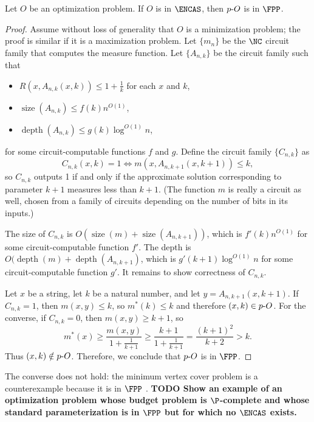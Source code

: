 \documentclass{article}
\newcommand{\todo}[1]{\textbf{TODO #1}}
\newcommand{\dash}{\textnormal{-}}
\DeclareMathOperator{\depth}{depth}
\DeclareMathOperator{\size}{size}
\begin{document}
\begin{theorem}\label{thm:encasfpp}
  Let $O$ be an optimization problem.
  If $O$ is in $\ENCAS$, then $p\dash{O}$ is in $\FPP$.
\end{theorem}
\begin{proof}
  Assume without loss of generality that $O$ is a minimization problem; the proof is similar if it is a maximization problem.
  Let $\{m_n\}$ be the $\NC$ circuit family that computes the measure function.
  Let $\{A_{n, k}\}$ be the circuit family such that
  \begin{itemize}
  \item $R(x, A_{n, k}(x, k)) \leq 1 + \frac{1}{k}$ for each $x$ and $k$,
  \item $\size(A_{n, k}) \leq f(k) n^{O(1)}$,
  \item $\depth(A_{n, k}) \leq g(k) \log^{O(1)} n$,
  \end{itemize}
  for some circuit-computable functions $f$ and $g$.
  Define the circuit family $\{C_{n, k}\}$ as
  \[
  C_{n, k}(x, k) = 1 \iff m(x, A_{n, k + 1}(x, k + 1)) \leq k,
  \]
  so $C_{n, k}$ outputs 1 if and only if the approximate solution corresponding to parameter $k + 1$ measures less than $k + 1$.
  (The function $m$ is really a circuit as well, chosen from a family of circuits depending on the number of bits in its inputs.)

  The size of $C_{n, k}$ is $O(\size(m) + \size(A_{n, k + 1}))$, which is $f'(k)n^{O(1)}$ for some circuit-computable function $f'$.
  The depth is $O(\depth(m) + \depth(A_{n, k + 1})$, which is $g'(k + 1) \log^{O(1)} n$ for some circuit-computable function $g'$.
  It remains to show correctness of $C_{n, k}$.

  Let $x$ be a string, let $k$ be a natural number, and let $y = A_{n, k + 1}(x, k + 1)$.
  If $C_{n, k} = 1$, then $m(x, y) \leq k$, so $m^*(k) \leq k$ and therefore $(x, k) \in p \dash O$.
  For the converse, if $C_{n, k} = 0$, then $m(x, y) \geq k + 1$, so
  \[
  m^*(x) \geq \frac{m(x, y)}{1 + \frac{1}{k + 1}} \geq \frac{k + 1}{1 + \frac{1}{k + 1}} = \frac{(k + 1)^2}{k + 2} > k.
  \]
  Thus $(x, k) \notin p \dash O$.
  Therefore, we conclude that $p \dash O$ is in $\FPP$.
\end{proof}

The converse does not hold: the minimum vertex cover problem is a counterexample because it is in $\FPP$ \autocite[Theorem~4.5]{bst15}.
\todo{Show an example of an optimization problem whose budget problem is $\P$-complete and whose standard parameterization is in $\FPP$ but for which no $\ENCAS$ exists.}
\end{document}
